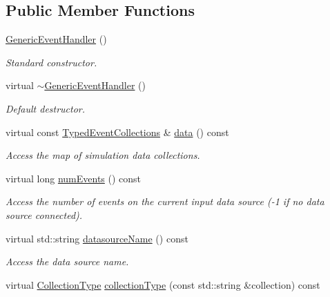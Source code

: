 \subsection*{Public Member Functions}
\begin{DoxyCompactItemize}
\item 
\hyperlink{class_d_d4hep_1_1_generic_event_handler_aef493617474019a953be658fdec60edc}{GenericEventHandler} ()
\begin{DoxyCompactList}\small\item\em Standard constructor. \item\end{DoxyCompactList}\item 
virtual \hyperlink{class_d_d4hep_1_1_generic_event_handler_a2e5420d14f01ae34c9a0a670a374cf71}{$\sim$GenericEventHandler} ()
\begin{DoxyCompactList}\small\item\em Default destructor. \item\end{DoxyCompactList}\item 
virtual const \hyperlink{class_d_d4hep_1_1_event_handler_a4d441ff8a824b1e2f278e8b7a6391af3}{TypedEventCollections} \& \hyperlink{class_d_d4hep_1_1_generic_event_handler_aa1e4452bde1823d4592d4c61f6a62fcc}{data} () const 
\begin{DoxyCompactList}\small\item\em Access the map of simulation data collections. \item\end{DoxyCompactList}\item 
virtual long \hyperlink{class_d_d4hep_1_1_generic_event_handler_a48f6771f5f90bd353e7b242f247a91cb}{numEvents} () const 
\begin{DoxyCompactList}\small\item\em Access the number of events on the current input data source (-\/1 if no data source connected). \item\end{DoxyCompactList}\item 
virtual std::string \hyperlink{class_d_d4hep_1_1_generic_event_handler_a9049182126476c4af50c72d15c120471}{datasourceName} () const 
\begin{DoxyCompactList}\small\item\em Access the data source name. \item\end{DoxyCompactList}\item 
virtual \hyperlink{class_d_d4hep_1_1_event_handler_a0b22a141a019364495835317fad48254}{CollectionType} \hyperlink{class_d_d4hep_1_1_generic_event_handler_ae0471fce8b637f5825d3dab70537bdcd}{collectionType} (const std::string \&collection) const 

\end{DoxyCompactItemize}
